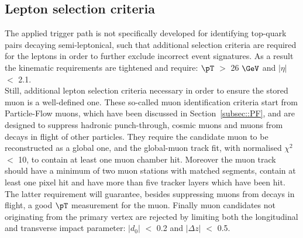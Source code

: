 \subsection{Lepton selection criteria}
The applied trigger path is not specifically developed for identifying top-quark pairs decaying semi-leptonical, such that additional selection criteria are required for the leptons in order to further exclude incorrect event signatures. As a result the kinematic requirements are tightened and require: $\pT$ $>$ 26 $\GeV$ and $\vert \eta \vert$ $<$ 2.1.
\\
Still, additional lepton selection criteria necessary in order to ensure the stored muon is a well-defined one.
These so-called muon identification criteria start from Particle-Flow muons, which have been discussed in Section~\ref{subsec::PF}, and are designed to suppress hadronic punch-through, cosmic muons and muons from decays in flight of other particles.
They require the candidate muon to be reconstructed as a global one, and the global-muon track fit, with normalised $\chi^{2}$ $<$ 10, to contain at least one muon chamber hit.
Moreover the muon track should have a minimum of two muon stations with matched segments, contain at least one pixel hit and have more than five tracker layers which have been hit. The latter requirement will guarantee, besides suppressing muons from decays in flight, a good $\pT$ measurement for the muon.
Finally muon candidates not originating from the primary vertex are rejected by limiting both the longitudinal and transverse impact parameter: $\vert d_0 \vert$ $<$ 0.2 and $\vert \Delta z \vert$ $<$ 0.5.

